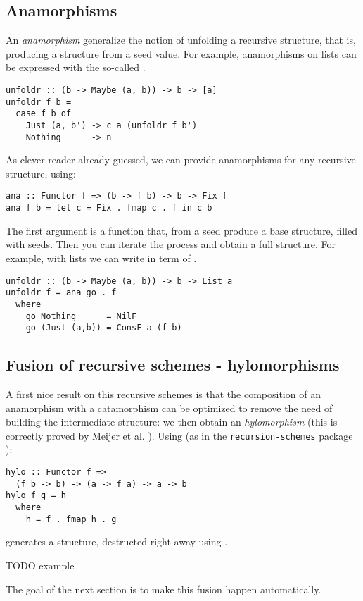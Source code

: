 \subsection{Anamorphisms}
An \emph{anamorphism} generalize the notion of unfolding a recursive structure, that is, producing a structure from a seed value.
For example, anamorphisms on lists can be expressed with the so-called .
\begin{verbatim}
unfoldr :: (b -> Maybe (a, b)) -> b -> [a]
unfoldr f b =
  case f b of
    Just (a, b') -> c a (unfoldr f b')
    Nothing      -> n
\end{verbatim}

\noindent As clever reader already guessed, we can provide anamorphisms for any recursive structure, using:
\begin{verbatim}
ana :: Functor f => (b -> f b) -> b -> Fix f
ana f b = let c = Fix . fmap c . f in c b
\end{verbatim}
The first argument is a function that, from a seed produce a base structure, filled with seeds. Then you can iterate the process and obtain a full structure. For example, with lists we can write  in term of .
\begin{verbatim}
unfoldr :: (b -> Maybe (a, b)) -> b -> List a
unfoldr f = ana go . f
  where
    go Nothing      = NilF
    go (Just (a,b)) = ConsF a (f b)
\end{verbatim}

\subsection{Fusion of recursive schemes - hylomorphisms}
A first nice result on this recursive schemes is that the composition of an anamorphism with a catamorphism can be optimized to remove the need of building the intermediate structure: we then obtain an \emph{hylomorphism} (this is correctly proved by Meijer et al. \cite{4cec4a43c86444479dc0003182424795}).
Using (as in the \verb|recursion-schemes| package \cite{ekmett:eschems}):
\begin{verbatim}
hylo :: Functor f =>
  (f b -> b) -> (a -> f a) -> a -> b
hylo f g = h 
  where 
    h = f . fmap h . g
\end{verbatim}
\noindent {} generates a structure, destructed right away using .

TODO example

The goal of the next section is to make this fusion happen automatically.